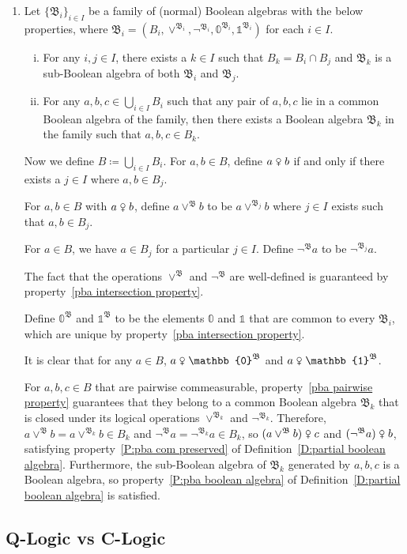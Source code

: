 \documentclass{scrartcl}
\newcommand{\FB}{\mathfrak{B}}
\newcommand{\com}{\mathrel{\venus}}
\begin{document}
\begin{examples}
\begin{enumerate}
It can be verified that the structure $\FB=(B,\venus,\lor,\neg,\mathbb{0},\mathbb{1})$ is a partial Boolean algebra.

\item
Let $\{\FB_i\}_{i\in I}$ be a family of (normal) Boolean algebras with the below properties, where $\FB_i=(B_i,\lor^{\FB_i},\neg^{\FB_i},\mathbb{0}^{\FB_i},\mathbb{1}^{\FB_i})$ for each $i\in I$.
\begin{enumerate}[(i)]
\item\label{pba intersection property}
For any $i,j\in I$, there exists a $k\in I$ such that $B_k=B_i\cap B_j$ and $\FB_k$ is a sub-Boolean algebra of both $\FB_i$ and $\FB_j$.

\item\label{pba pairwise property}
For any $a,b,c\in\bigcup_{i\in I}B_i$ such that any pair of $a,b,c$ lie in a common Boolean algebra of the family, then there exists a Boolean algebra $\FB_k$ in the family such that $a,b,c\in B_k$.
\end{enumerate}

Now we define $B\coloneq\bigcup_{i\in I}B_i$. For $a,b\in B$, define $a\com b$ if and only if there exists a $j\in I$ where $a,b\in B_j$.

For $a,b\in B$ with $a\com b$, define $a\lor^{\FB}b$ to be $a\lor^{\FB_j}b$ where $j\in I$ exists such that $a,b\in B_j$.

For $a\in B$, we have $a\in B_j$ for a particular $j\in I$. Define $\neg^{\FB}a$ to be $\neg^{\FB_j}a$.

The fact that the operations $\lor^{\FB}$ and $\neg^{\FB}$ are well-defined is guaranteed by property~\ref{pba intersection property}.

Define $\mathbb{0}^{\FB}$ and $\mathbb{1}^{\FB}$ to be the elements $\mathbb{0}$ and $\mathbb{1}$ that are common to every $\FB_i$, which are unique by property~\ref{pba intersection property}.

It is clear that for any $a\in B$, $a\com\mathbb{0}^{\FB}$ and $a\com\mathbb{1}^{\FB}$.

For $a,b,c\in B$ that are pairwise commeasurable, property~\ref{pba pairwise property} guarantees that they belong to a common Boolean algebra $\FB_k$ that is closed under its logical operations $\lor^{\FB_k}$ and $\neg^{\FB_k}$. Therefore, $a\lor^{\FB}b=a\lor^{\FB_k}b\in B_k$ and $\neg^{\FB}a=\neg^{\FB_k}a\in B_k$, so $(a\lor^{\FB}b)\com c$ and $(\neg^{\FB}a)\com b$, satisfying property~\ref{P:pba com preserved} of Definition~\ref{D:partial boolean algebra}. Furthermore, the sub-Boolean algebra of $\FB_k$ generated by $a,b,c$ is a Boolean algebra, so property~\ref{P:pba boolean algebra} of Definition~\ref{D:partial boolean algebra} is satisfied.

\end{enumerate}
\end{examples}


\subsection{Q-Logic vs C-Logic}







\newpage
\end{document}
